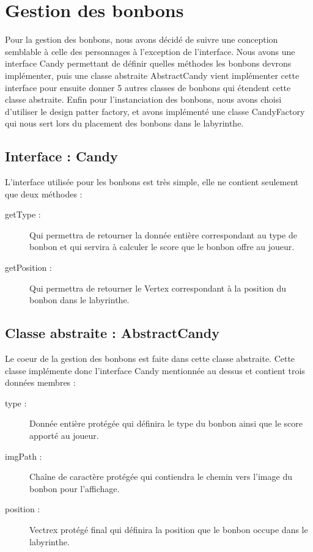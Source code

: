 \documentclass [10pt, a4paper]{article}
\begin{document}
\section {Gestion des bonbons}
Pour la gestion des bonbons, nous avons décidé de suivre une conception semblable à celle des personnages à l'exception de l'interface. Nous avons une interface Candy permettant de définir quelles méthodes les bonbons devrons implémenter, puis une classe abstraite AbstractCandy vient implémenter cette interface pour ensuite donner 5 autres classes de bonbons qui étendent cette classe abstraite. Enfin pour l'instanciation des bonbons, nous avons choisi d'utiliser le design patter factory, et avons implémenté une classe CandyFactory qui nous sert lors du placement des bonbons dans le labyrinthe.

\subsection {Interface : Candy}
L'interface utilisée pour les bonbons est très simple, elle ne contient seulement que deux méthodes :
\begin {description}
\item  [getType :]     Qui permettra de retourner la donnée entière correspondant au type de bonbon et qui servira à calculer le score que le bonbon offre au joueur.
\item  [getPosition :] Qui permettra de retourner le Vertex correspondant à la position du bonbon dans le labyrinthe.
\end   {description}


\subsection {Classe abstraite : AbstractCandy}
Le coeur de la gestion des bonbons est faite dans cette classe abstraite. Cette classe implémente donc l'interface Candy mentionnée au dessus et contient trois données membres :
\begin {description}
\item  [type :]     Donnée entière protégée qui définira le type du bonbon ainsi que le score apporté au joueur.
\item  [imgPath :]  Chaîne de caractère protégée qui contiendra le chemin vers l'image du bonbon pour l'affichage.
\item  [position :] Vectrex protégé final qui définira la position que le bonbon occupe dans le labyrinthe.
\end   {description}
\end{document}
